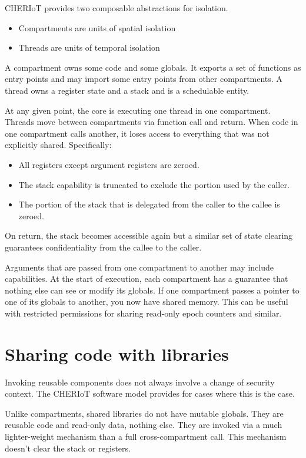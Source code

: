 CHERIoT provides two composable abstractions for isolation.

\begin{itemize}
	\item{Compartments are units of spatial isolation}
	\item{Threads are units of temporal isolation}
\end{itemize}

A compartment owns some code and some globals.
It exports a set of functions as entry points and may import some entry points from other compartments.
A thread owns a register state and a stack and is a schedulable entity.

At any given point, the core is executing one thread in one compartment.
Threads move between compartments via function call and return.
When code in one compartment calls another, it loses access to everything that was not explicitly shared.
Specifically:

\begin{itemize}
	\item{All registers except argument registers are zeroed.}
	\item{The stack capability is truncated to exclude the portion used by the caller.}
	\item{The portion of the stack that is delegated from the caller to the callee is zeroed.}
\end{itemize}

On return, the stack becomes accessible again but a similar set of state clearing guarantees confidentiality from the callee to the caller.

Arguments that are passed from one compartment to another may include capabilities.
At the start of execution, each compartment has a guarantee that nothing else can see or modify its globals.
If one compartment passes a pointer to one of its globals to another, you now have shared memory.
This can be useful with restricted permissions for sharing read-only epoch counters and similar.

\section{Sharing code with libraries}

Invoking reusable components does not always involve a change of security context.
The CHERIoT software model provides  for cases where this is the case.

Unlike compartments, shared libraries do not have mutable globals.
They are reusable code and read-only data, nothing else.
They are invoked via a much lighter-weight mechanism than a full cross-compartment call.
This mechanism doesn't clear the stack or registers.


